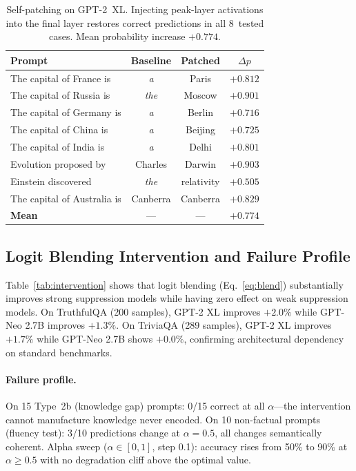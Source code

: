 \documentclass{article}
\begin{document}
\begin{table}[htbp]
\caption{Self-patching on GPT-2~XL. Injecting peak-layer activations into
the final layer restores correct predictions in all 8~tested cases.
Mean probability increase $+0.774$.}
\label{tab:patching}
\centering\small
\begin{tabular}{lccc}
\toprule
\textbf{Prompt} & \textbf{Baseline}
  & \textbf{Patched} & $\Delta p$ \\
\midrule
The capital of France is     & \textit{a}   & Paris      & $+0.812$ \\
The capital of Russia is     & \textit{the} & Moscow     & $+0.901$ \\
The capital of Germany is    & \textit{a}   & Berlin     & $+0.716$ \\
The capital of China is      & \textit{a}   & Beijing    & $+0.725$ \\
The capital of India is      & \textit{a}   & Delhi      & $+0.801$ \\
Evolution proposed by        & Charles      & Darwin     & $+0.903$ \\
Einstein discovered          & \textit{the} & relativity & $+0.505$ \\
The capital of Australia is  & Canberra     & Canberra   & $+0.829$ \\
\midrule
\textbf{Mean} & --- & --- & $\mathbf{+0.774}$ \\
\bottomrule
\end{tabular}
\end{table}

\subsection{Logit Blending Intervention and Failure Profile}

Table~\ref{tab:intervention} shows that logit blending (Eq.~\ref{eq:blend})
substantially improves strong suppression models while having zero effect on
weak suppression models.
On TruthfulQA (200 samples), GPT-2 XL improves $+2.0\%$ while GPT-Neo 2.7B
improves $+1.3\%$.
On TriviaQA (289 samples), GPT-2 XL improves $+1.7\%$ while GPT-Neo 2.7B
shows $+0.0\%$, confirming architectural dependency on standard benchmarks.

\paragraph{Failure profile.}
On 15 Type~2b (knowledge gap) prompts: 0/15 correct at all $\alpha$---the
intervention cannot manufacture knowledge never encoded.
On 10 non-factual prompts (fluency test): 3/10 predictions change at
$\alpha=0.5$, all changes semantically coherent.
Alpha sweep ($\alpha \in [0,1]$, step 0.1): accuracy rises from 50\% to 90\%
at $\alpha \geq 0.5$ with no degradation cliff above the optimal value.
\end{document}
